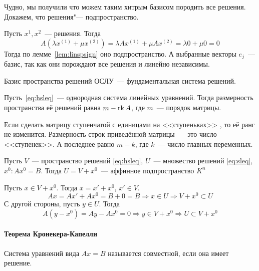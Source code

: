 \documentclass[12pt]{../../../notes}
\begin{document}
\begin{ittproof}
  Чудно, мы получили что можем таким хитрым базисом породить все решения. Докажем, что
  решения"--- подпространство.
  
  Пусть $x^1, x^2$~--- решения. Тогда
  \[
    A(\lambda x^{(1)} + \mu x^{(2)}) = \lambda A x^{(1)} + \mu A x^{(2)} = \lambda 0 + \mu 0 = 0
  \]
  Тогда по лемме~\ref{lem:linspsign} оно подпространство. А выбранные векторы $e_j$~--- базис,
  так как они порождают все решения и линейно независимы.
\end{ittproof}  

\begin{defn}\label{defn:fundsol}
  Базис пространства решений ОСЛУ~--- фундаментальная система решений.
\end{defn}

\begin{thrm}\label{thrm:dimsolnslq}
  Пусть~\eqref{eq:hsleq}~--- однородная система линейных уравнений. Тогда размерность
  пространства её решений равна $m - \operatorname{rk} A$, где $m$~--- порядок матрицы.
\end{thrm}
\begin{ittproof}
  Если сделать матрицу ступенчатой с единицами на <<ступеньках>> , то её ранг не изменится. 
  Размерность строк приведённой матрицы~--- это число <<ступенек>>. 
  А последнее равно $m-k$, где $k$~--- число главных переменных.
\end{ittproof}

\begin{thrm}\label{thrm:homtoordlinsys}
  Пусть $V$~--- пространство решений \eqref{eq:hsleq}, $U$~--- множество решений \eqref{eq:sleq},
  $x^0\colon Ax^0 = B$. Тогда $U =  V+ x^0$~--- аффинное подпространство $K^n$ 
\end{thrm}
\begin{ittproof}
  Пусть $x \in V + x^0$. Тогда $x = x'+ x^0$, $x' \in V$.
  \[
    A x = Ax' + Ax^0 = B + 0 = B \Rightarrow x\in U \Rightarrow V + x^0 \subset U
  \]
  С другой стороны, пусть $y \in U$. Тогда 
  \[
    A(y - x^0) = Ay - Ax^0 = 0 \Rightarrow y \in V+x^0 \Rightarrow U \subset V+ x^0 
  \]
\end{ittproof}

\paragraph{Теорема Кронекера-Капелли}

\begin{defn}\label{defn:compsysleq}
  Система уравнений вида $Ax=B$ называется совместной, если она имеет решение.
\end{defn}
\end{document}
